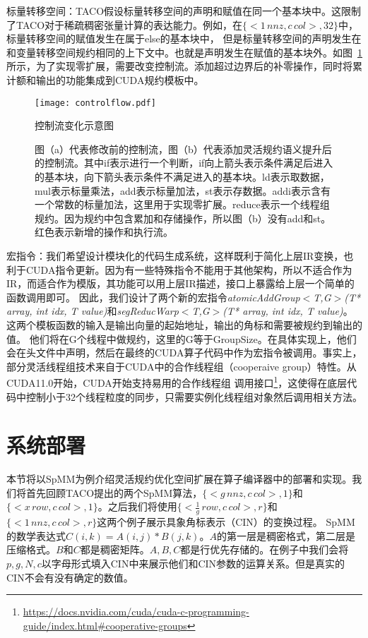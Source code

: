 标量转移空间：TACO假设标量转移空间的声明和赋值在同一个基本块中\cite{kjolstad:2019:workspaces}。这限制了TACO对于稀疏稠密张量计算的表达能力。例如，在$\{<1\,nnz , c\,col>,32\}$中，标量转移空间的赋值发生在属于else的基本块中，
但是标量转移空间的声明发生在和变量转移空间规约相同的上下文中。也就是声明发生在赋值的基本块外。如图~\ref{fig:controlflow}所示，为了实现零扩展，需要改变控制流。添加超过边界后的补零操作，同时将累计额和输出的功能集成到CUDA规约模板中。
\begin{figure}[h]%
  \centering
  \texttt{[image: controlflow.pdf]}
  \caption{控制流变化示意图}
  \caption*{图（a）代表修改前的控制流，图（b）代表添加灵活规约语义提升后的控制流。其中if表示进行一个判断，if向上箭头表示条件满足后进入的基本块，向下箭头表示条件不满足进入的基本块。ld表示取数据，mul表示标量乘法，add表示标量加法，st表示存数据。addi表示含有一个常数的标量加法，这里用于实现零扩展。reduce表示一个线程组规约。因为规约中包含累加和存储操作，所以图（b）没有add和st。红色表示新增的操作和执行流。}
  \label{fig:controlflow}
\end{figure}
宏指令：我们希望设计模块化的代码生成系统，这样既利于简化上层IR变换，也利于CUDA指令更新。因为有一些特殊指令不能用于其他架构，所以不适合作为IR，而适合作为模版，其功能可以用上层IR描述，接口上暴露给上层一个简单的函数调用即可。
因此，我们设计了两个新的宏指令\textit{atomicAddGroup$<$T,G$>$(T* array, int idx, T value)}和\textit{segReducWarp$<$T,G$>$(T* array, int idx, T value)}。这两个模板函数的输入是输出向量的起始地址，输出的角标和需要被规约到输出的值。
他们将在G个线程中做规约，这里的G等于GroupSize。在具体实现上，他们会在头文件中声明，然后在最终的CUDA算子代码中作为宏指令被调用。事实上，部分灵活线程组技术来自于CUDA中的合作线程组（cooperaive group）特性。从CUDA11.0开始，CUDA开始支持易用的合作线程组
调用接口\footnote{\url{https://docs.nvidia.com/cuda/cuda-c-programming-guide/index.html\#cooperative-groups}}，这使得在底层代码中控制小于32个线程粒度的同步，只需要实例化线程组对象然后调用相关方法。
\section{系统部署}
本节将以SpMM为例介绍灵活规约优化空间扩展在算子编译器中的部署和实现。我们将首先回顾TACO提出的两个SpMM算法，$\{<g\,nnz, c\,col>,1\}$和$\{<x\,row,c\,col >,1\}$。之后我们将使用$\{<\frac{1}{g}\,row, c\,col>,r\}$和$\{<1\,nnz , c\,col>,r\}$这两个例子展示具象角标表示（CIN）的变换过程。
SpMM的数学表达式$C(i,k) = A(i,j) * B(j,k)$。$A$的第一层是稠密格式，第二层是压缩格式。$B$和$C$都是稠密矩阵。$A,B,C$都是行优先存储的。在例子中我们会将$p,g,N,c$以字母形式填入CIN中来展示他们和CIN参数的运算关系。但是真实的CIN不会有没有确定的数值。
